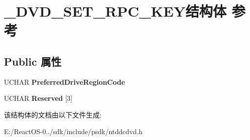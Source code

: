 \hypertarget{struct___d_v_d___s_e_t___r_p_c___k_e_y}{}\section{\+\_\+\+D\+V\+D\+\_\+\+S\+E\+T\+\_\+\+R\+P\+C\+\_\+\+K\+E\+Y结构体 参考}
\label{struct___d_v_d___s_e_t___r_p_c___k_e_y}
\subsection*{Public 属性}
\begin{DoxyCompactItemize}
\item 
\mbox{\label{struct___d_v_d___s_e_t___r_p_c___k_e_y_aa27340d6b8e8920acf97268dc0837493}} 
U\+C\+H\+AR {\bfseries Preferred\+Drive\+Region\+Code}
\item 
\mbox{\label{struct___d_v_d___s_e_t___r_p_c___k_e_y_ae0c1d06ed1f604b2d013233054661b04}} 
U\+C\+H\+AR {\bfseries Reserved} \mbox{[}3\mbox{]}
\end{DoxyCompactItemize}


该结构体的文档由以下文件生成\+:\begin{DoxyCompactItemize}
\item 
E\+:/\+React\+O\+S-\/0../sdk/include/psdk/ntddcdvd.\+h\end{DoxyCompactItemize}
